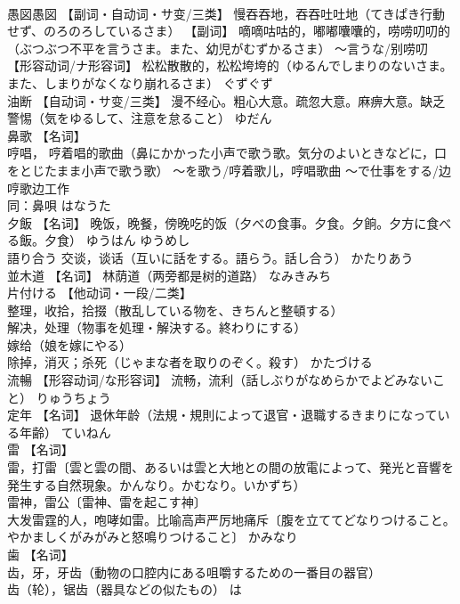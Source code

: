 \documentclass[8pt]{extreport}
\begin{document}
\begin{CJK}{UTF8}{min}
\\	愚図愚図	【副词・自动词・サ变/三类】 慢吞吞地，吞吞吐吐地（てきぱき行動せず、のろのろしているさま） 【副词】 嘀嘀咕咕的，嘟嘟囔囔的，唠唠叨叨的（ぶつぶつ不平を言うさま。また、幼児がむずかるさま） ～言うな/别唠叨 【形容动词/ナ形容词】 松松散散的，松松垮垮的（ゆるんでしまりのないさま。また、しまりがなくなり崩れるさま）	ぐずぐず	
\\	油断	【自动词・サ变/三类】 漫不经心。粗心大意。疏忽大意。麻痹大意。缺乏警惕（気をゆるして、注意を怠ること）	ゆだん	
\\	鼻歌	【名词】 
\\	哼唱， 哼着唱的歌曲（鼻にかかった小声で歌う歌。気分のよいときなどに，口をとじたまま小声で歌う歌） 〜を歌う/哼着歌儿，哼唱歌曲 〜で仕事をする/边哼歌边工作 
\\	同：鼻唄	はなうた	
\\	夕飯	【名词】 晚饭，晚餐，傍晚吃的饭（夕べの食事。夕食。夕餉。夕方に食べる飯。夕食）	ゆうはん ゆうめし	
\\	語り合う	交谈，谈话（互いに話をする。語らう。話し合う）	かたりあう	
\\	並木道	【名词】 林荫道（两旁都是树的道路）	なみきみち	
\\	片付ける	【他动词・一段/二类】 
\\	整理，收拾，拾掇（散乱している物を、きちんと整頓する） 
\\	解决，处理（物事を処理・解決する。終わりにする） 
\\	嫁给（娘を嫁にやる） 
\\	除掉，消灭；杀死（じゃまな者を取りのぞく。殺す）	かたづける	
\\	流暢	【形容动词/な形容词】 流畅，流利（話しぶりがなめらかでよどみないこと）	りゅうちょう	
\\	定年	【名词】 退休年龄（法規・規則によって退官・退職するきまりになっている年齢）	ていねん	
\\	雷	【名词】 
\\	雷，打雷〔雲と雲の間、あるいは雲と大地との間の放電によって、発光と音響を発生する自然現象。かんなり。かむなり。いかずち） 
\\	雷神，雷公〔雷神、雷を起こす神〕 
\\	大发雷霆的人，咆哮如雷。比喻高声严厉地痛斥〔腹を立ててどなりつけること。やかましくがみがみと怒鳴りつけること〕	かみなり	
\\	歯	【名词】 
\\	齿，牙，牙齿（動物の口腔内にある咀嚼するための一番目の器官） 
\\	齿（轮），锯齿（器具などの似たもの）	は	

\end{CJK}
\end{document}
